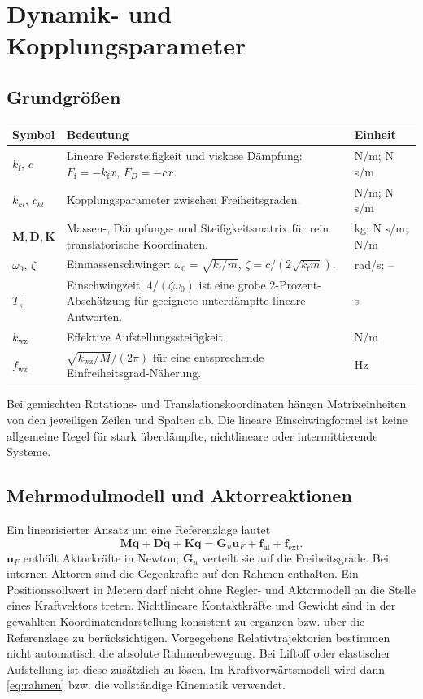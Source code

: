 \documentclass[11pt,a4paper]{article}
\makeatletter
\newenvironment{symtab}{\begin{longtable}{@{}L{.22\textwidth}L{.62\textwidth}L{.12\textwidth}@{}}\toprule\textbf{Symbol}&\textbf{Bedeutung}&\textbf{Einheit}\\\midrule\endhead}{\bottomrule\end{longtable}}
\makeatother
\begin{document}
\section{Dynamik- und Kopplungsparameter}\label{sec:dynamik}
\subsection{Grundgrößen}
\begin{symtab}
$k_{\mathrm f}$, $c$&Lineare Federsteifigkeit und viskose Dämpfung: $F_{\mathrm f}=-k_{\mathrm f}x$, $F_D=-c\dot x$.&N/m; N s/m\\
$k_{kl}$, $c_{kl}$&Kopplungsparameter zwischen Freiheitsgraden.&N/m; N s/m\\
$\mathbf M,\mathbf D,\mathbf K$&Massen-, Dämpfungs- und Steifigkeitsmatrix für rein translatorische Koordinaten.&kg; N s/m; N/m\\
$\omega_0$, $\zeta$&Einmassenschwinger: $\omega_0=\sqrt{k_{\mathrm f}/m}$, $\zeta=c/(2\sqrt{k_{\mathrm f}m})$.&rad/s; --\\
$T_s$&Einschwingzeit. $4/(\zeta\omega_0)$ ist eine grobe 2-Prozent-Abschätzung für geeignete unterdämpfte lineare Antworten.&s\\
$k_{\mathrm{wz}}$&Effektive Aufstellungssteifigkeit.&N/m\\
$f_{\mathrm{wz}}$&$\sqrt{k_{\mathrm{wz}}/M}/(2\pi)$ für eine entsprechende Einfreiheitsgrad-Näherung.&Hz\\
\end{symtab}
Bei gemischten Rotations- und Translationskoordinaten hängen Matrixeinheiten von den jeweiligen Zeilen und Spalten ab. Die lineare Einschwingformel ist keine allgemeine Regel für stark überdämpfte, nichtlineare oder intermittierende Systeme.

\subsection{Mehrmodulmodell und Aktorreaktionen}
Ein linearisierter Ansatz um eine Referenzlage lautet
\begin{equation}
\mathbf M\ddot{\mathbf q}+\mathbf D\dot{\mathbf q}+\mathbf K\mathbf q
=\mathbf G_u\mathbf u_F+\mathbf f_{\mathrm{nl}}+\mathbf f_{\mathrm{ext}}.
\label{eq:dynamik}
\end{equation}
$\mathbf u_F$ enthält Aktorkräfte in Newton; $\mathbf G_u$ verteilt sie auf die Freiheitsgrade. Bei internen Aktoren sind die Gegenkräfte auf den Rahmen enthalten. Ein Positionssollwert in Metern darf nicht ohne Regler- und Aktormodell an die Stelle eines Kraftvektors treten. Nichtlineare Kontaktkräfte und Gewicht sind in der gewählten Koordinatendarstellung konsistent zu ergänzen bzw. über die Referenzlage zu berücksichtigen.
Vorgegebene Relativtrajektorien bestimmen nicht automatisch die absolute Rahmenbewegung. Bei Liftoff oder elastischer Aufstellung ist diese zusätzlich zu lösen. Im Kraftvorwärtsmodell wird dann \eqref{eq:rahmen} bzw. die vollständige Kinematik verwendet.
\end{document}
